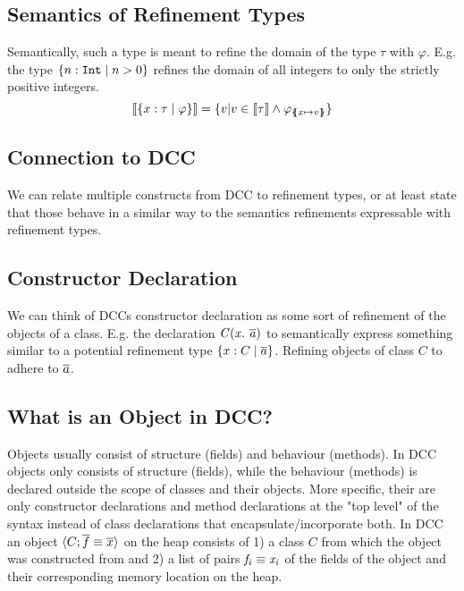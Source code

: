\documentclass[a4paper]{article}
\begin{document}
\subsection{Semantics of Refinement Types}
Semantically, such a type is meant to refine the domain of the type $\tau$
with $\varphi$. E.g. the type $\{n:\mathtt{Int} \mid n>0\}$
refines the domain of all integers to only the strictly positive integers.
\[
  \llbracket \{x:\tau \mid \varphi\} \rrbracket =
    \{ v | v \in \llbracket\tau\rrbracket \land \varphi_{\{\mskip-6.9mu\{ x \mapsto v \}\mskip-6.9mu\}} \}
\]

\subsection{Connection to DCC}
We can relate multiple constructs from DCC to refinement types,
or at least state that those behave in a similar way to the semantics
refinements expressable with refinement types.

\subsection{Constructor Declaration}
We can think of DCCs constructor declaration as some sort of
refinement of the objects of a class.
E.g. the declaration $\mathit{C}(\mathit{x}.\ \mathit{\overline{a}})$
to semantically express something similar to a potential refinement type
$\{x:C \mid \overline{a}\}$.
Refining objects of class $C$ to adhere to $\overline{a}$.


\subsection{What is an Object in DCC?}
%
Objects usually consist of structure (fields) and behaviour (methods).
In DCC objects only consists of structure (fields), while the behaviour (methods)
is declared outside the scope of classes and their objects.
More specific, their are only constructor declarations and method declarations
at the "top level" of the syntax instead of class declarations that encapsulate/incorporate both.
In DCC an object $\langle C;\overline{f} \equiv \overline{x} \rangle$ on the heap consists of
1) a class $C$ from which the object was constructed from and
2) a list of pairs $\mathit{f_i} \equiv \mathit{x_i}$ of the fields of the object
and their corresponding memory location on the heap.
\end{document}
